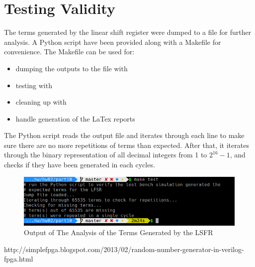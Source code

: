 \documentclass[paper=usletter, fontsize=12pt]{article}
\begin{document}
    \section{Testing Validity}
    The terms generated by the linear shift register were dumped to a file for further analysis. A Python script have been provided along with a Makefile for convenience. The Makefile can be used for:
    \begin{itemize}
        \item dumping the outputs to the file with 
        \item testing with 
        \item cleaning up with 
        \item handle generation of the LaTex reports
    \end{itemize}

    The Python script reads the output file and iterates through each line to make sure there are no more repetitions of terms than expected. After that, it iterates through the binary representation of all decimal integers from 1 to $2^{16}-1$, and checks if they have been generated in each cycles.

    \begin{figure}[ht]
        \begin{center}
            \includegraphics[width=1\textwidth]{testout.png}
            \caption{Output of The Analysis of the Terms Generated by the LSFR} \label{fig:testout}
        \end{center}
    \end{figure}


    \begin{thebibliography}{9}
         http://simplefpga.blogspot.com/2013/02/random-number-generator-in-verilog-fpga.html
    \end{thebibliography}
\end{document}
